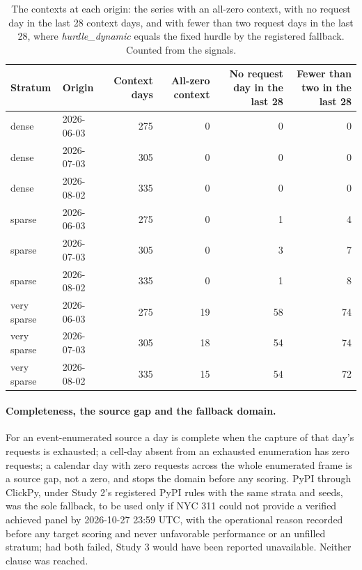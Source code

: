\begin{table}[htbp]
\centering\footnotesize\setlength{\tabcolsep}{3.5pt}
\caption{The contexts at each origin: the series with an all-zero context, with no request day in the last
28 context days, and with fewer than two request days in the last 28, where \emph{hurdle\_dynamic} equals
the fixed hurdle by the registered fallback. Counted from the signals.}
\label{tab:s3context}
\begin{tabular}{llrrrr}
\toprule
Stratum & Origin & Context days & All-zero context & No request day in the last 28 & Fewer than two in the last 28 \\
\midrule
dense & 2026-06-03 & 275 & 0 & 0 & 0 \\
dense & 2026-07-03 & 305 & 0 & 0 & 0 \\
dense & 2026-08-02 & 335 & 0 & 0 & 0 \\
sparse & 2026-06-03 & 275 & 0 & 1 & 4 \\
sparse & 2026-07-03 & 305 & 0 & 3 & 7 \\
sparse & 2026-08-02 & 335 & 0 & 1 & 8 \\
very sparse & 2026-06-03 & 275 & 19 & 58 & 74 \\
very sparse & 2026-07-03 & 305 & 18 & 54 & 74 \\
very sparse & 2026-08-02 & 335 & 15 & 54 & 72 \\
\bottomrule
\end{tabular}
\end{table}

\paragraph{Completeness, the source gap and the fallback domain.} For an event-enumerated source a day is
complete when the capture of that day's requests is exhausted; a cell-day absent from an exhausted
enumeration has zero requests; a calendar day with zero requests across the whole enumerated frame is a
source gap, not a zero, and stops the domain before any scoring. PyPI through ClickPy, under Study 2's
registered PyPI rules with the same strata and seeds, was the sole fallback, to be used only if NYC 311
could not provide a verified achieved panel by 2026-10-27 23:59 UTC, with the operational reason recorded
before any target scoring and never unfavorable performance or an unfilled stratum; had both failed, Study 3
would have been reported unavailable. Neither clause was reached.

